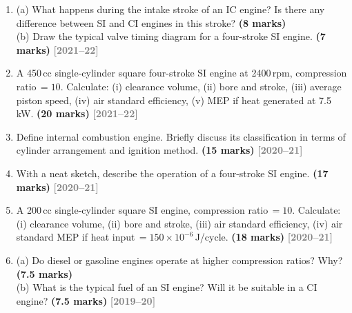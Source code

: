 \documentclass[12pt,a3paper]{article}
\newcommand{\yr}[1]{\hfill\textcolor{gray}{\small\textbf{[#1]}}}
\newcommand{\mk}[1]{\textcolor{orange!70!black}{\small\textbf{(#1 marks)}}}
\begin{document}
\begin{enumerate}
\item \label{qlabel:A2-Q7}
(a) What happens during the intake stroke of an IC engine? Is there any difference between SI and CI engines in this stroke? \mk{8}\\
(b) Draw the typical valve timing diagram for a four-stroke SI engine. \mk{7}
\yr{2021--22}




\item \label{qlabel:A2-Q11}
A 450\,cc single-cylinder square four-stroke SI engine at 2400\,rpm, compression ratio\,$= 10$. Calculate: (i) clearance volume, (ii) bore and stroke, (iii) average piston speed, (iv) air standard efficiency, (v) MEP if heat generated at 7.5\,kW. \mk{20}
\yr{2021--22}



\item \label{qlabel:A2-Q5}
Define internal combustion engine. Briefly discuss its classification in terms of cylinder arrangement and ignition method. \mk{15}
\yr{2020--21}




\item \label{qlabel:A2-Q6}
With a neat sketch, describe the operation of a four-stroke SI engine. \mk{17}
\yr{2020--21}




\item \label{qlabel:A2-Q10}
A 200\,cc single-cylinder square SI engine, compression ratio\,$= 10$. Calculate: (i) clearance volume, (ii) bore and stroke, (iii) air standard efficiency, (iv) air standard MEP if heat input\,$= 150\times10^{-6}$\,J/cycle. \mk{18}
\yr{2020--21}




\item \label{qlabel:A2-Q3}
(a) Do diesel or gasoline engines operate at higher compression ratios? Why? \mk{7.5}\\
(b) What is the typical fuel of an SI engine? Will it be suitable in a CI engine? \mk{7.5}
\yr{2019--20}





\end{enumerate}
\end{document}
